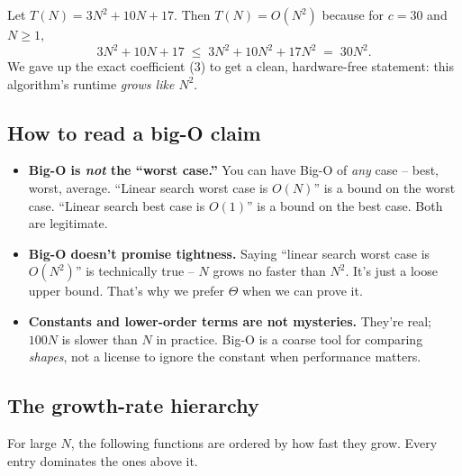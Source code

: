 \documentclass[11pt]{article}
\begin{document}
\begin{examplebox}
Let $T(N) = 3N^2 + 10N + 17$. Then $T(N) = O(N^2)$ because for
$c = 30$ and $N \ge 1$,
\[
  3N^2 + 10N + 17 \;\le\; 3N^2 + 10N^2 + 17N^2 \;=\; 30N^2.
\]
We gave up the exact coefficient ($3$) to get a clean, hardware-free
statement: this algorithm's runtime \emph{grows like $N^2$}.
\end{examplebox}

\subsection{How to read a big-O claim}

\begin{warnbox}
\begin{itemize}[leftmargin=*]
  \item \textbf{Big-O is \emph{not} the ``worst case.''} You can have
        Big-O of \emph{any} case -- best, worst, average. ``Linear
        search worst case is $O(N)$'' is a bound on the worst case.
        ``Linear search best case is $O(1)$'' is a bound on the best
        case. Both are legitimate.
  \item \textbf{Big-O doesn't promise tightness.} Saying ``linear
        search worst case is $O(N^2)$'' is technically true -- $N$
        grows no faster than $N^2$. It's just a loose upper bound.
        That's why we prefer $\Theta$ when we can prove it.
  \item \textbf{Constants and lower-order terms are not mysteries.}
        They're real; $100N$ is slower than $N$ in practice. Big-O is
        a coarse tool for comparing \emph{shapes}, not a license to
        ignore the constant when performance matters.
\end{itemize}
\end{warnbox}

\subsection{The growth-rate hierarchy}

For large $N$, the following functions are ordered by how fast they
grow. Every entry dominates the ones above it.
\end{document}
